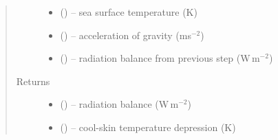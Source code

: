 \documentclass[letterpaper,10pt,english]{sphinxmanual}
\begin{document}
\begin{fulllineitems}
\begin{quote}
\begin{description}
\begin{itemize}
\item {} 
 (\href{https://docs.python.org/3/library/functions.html\#float}{}) -- sea surface temperature (K)

\item {} 
 (\href{https://docs.python.org/3/library/functions.html\#float}{}) -- acceleration of gravity (ms$^{-2}$)

\item {} 
 (\href{https://docs.python.org/3/library/functions.html\#float}{}) -- radiation balance from previous step (W\,m$^{-2}$)

\end{itemize}

\item[{Returns}] \leavevmode
\begin{itemize}
\item {} 
 (\href{https://docs.python.org/3/library/functions.html\#float}{}) -- radiation balance (W\,m$^{-2}$)

\item {} 
 (\href{https://docs.python.org/3/library/functions.html\#float}{}) -- cool-skin temperature depression (K)

\end{itemize}

\end{description}\end{quote}
\end{fulllineitems}

\end{document}
